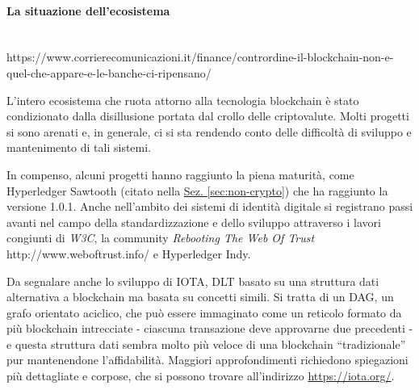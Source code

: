 \paragraph{La situazione dell'ecosistema} ~ \\
    https://www.corrierecomunicazioni.it/finance/contrordine-il-blockchain-non-e-quel-che-appare-e-le-banche-ci-ripensano/

    L'intero ecosistema che ruota attorno alla tecnologia blockchain è stato condizionato dalla disillusione portata dal crollo delle criptovalute. Molti progetti si sono arenati e, in generale, ci si sta rendendo conto delle difficoltà di sviluppo e mantenimento di tali sistemi.

    In compenso, alcuni progetti hanno raggiunto la piena maturità, come Hyperledger Sawtooth (citato nella \hyperref[sec:non-crypto]{Sez. \ref*{sec:non-crypto}}) che ha raggiunto la versione 1.0.1. Anche nell'ambito dei sistemi di identità digitale si registrano passi avanti nel campo della standardizzazione e dello sviluppo attraverso i lavori congiunti di \emph{W3C}, la community \emph{Rebooting The Web Of Trust} http://www.weboftrust.info/ e Hyperledger Indy.

    Da segnalare anche lo sviluppo di IOTA, DLT basato su una struttura dati alternativa a blockchain ma basata su concetti simili. Si tratta di un DAG, un grafo orientato aciclico, che può essere immaginato come un reticolo formato da più blockchain intrecciate - ciascuna transazione deve approvarne due precedenti - e questa struttura dati sembra molto più veloce di una blockchain ``tradizionale'' pur mantenendone l'affidabilità. Maggiori approfondimenti richiedono spiegazioni più dettagliate e corpose, che si possono trovare all'indirizzo \url{https://iota.org/}.